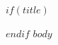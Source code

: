 \documentclass{handout}
\title$if(footer)$[$footer$]$endif${$title$}
\subtitle{$subtitle$}
\author{$for(author)$$author$$sep$ \and $endfor$}
\institute{$for(institute)$$institute$$sep$ \and $endfor$}
\date{$date$}
\begin{document}
$if(title)$
\maketitle
$endif$
$body$
\end{document}
